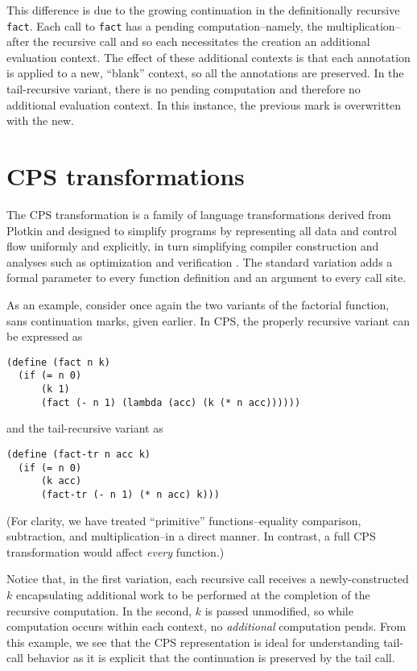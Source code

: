 \documentclass[ms,electronic,twosidetoc,letterpaper,chaptercenter,parttop]{byumsphd}
\begin{document}
This difference is due to the growing continuation in the definitionally recursive
\texttt{fact}. Each call to \texttt{fact} has a pending computation--namely, the
multiplication--after the recursive call and so each necessitates the creation an
additional evaluation context. The effect of these additional contexts is that each
annotation is applied to a new, ``blank'' context, so all the annotations are preserved. 
In the tail-recursive variant, there is no pending computation and therefore no additional
evaluation context. In this instance, the previous mark is overwritten with the new.

\chapter{CPS transformations}

The CPS transformation is a family of language transformations derived from Plotkin
\cite{plotkin1975call} and designed to simplify  programs by representing all data and
control flow uniformly and explicitly, in turn simplifying compiler construction and
analyses such as optimization and verification \cite{sabry1994formal}. The standard
variation adds a formal parameter to every function definition and an argument to every
call site.

As an example, consider once again the two variants of the factorial function, sans
continuation marks, given earlier. In CPS, the properly recursive variant can be expressed
as
\begin{verbatim}
(define (fact n k) 
  (if (= n 0)
      (k 1)
      (fact (- n 1) (lambda (acc) (k (* n acc))))))
\end{verbatim}
and the tail-recursive variant as
\begin{verbatim}
(define (fact-tr n acc k)
  (if (= n 0)
      (k acc)
      (fact-tr (- n 1) (* n acc) k)))
\end{verbatim}
(For clarity, we have treated ``primitive'' functions--equality comparison, subtraction,
and multiplication--in a direct manner. In contrast, a full CPS transformation would
affect \emph{every} function.)

Notice that, in the first variation, each recursive call receives a newly-constructed $k$
encapsulating additional work to be performed at the completion of the recursive
computation. In the second, $k$ is passed unmodified, so while computation occurs within
each context, no \emph{additional} computation pends. From this example, we see that the
CPS representation is ideal for understanding tail-call behavior as it is explicit that
the continuation is preserved by the tail call.
\end{document}

